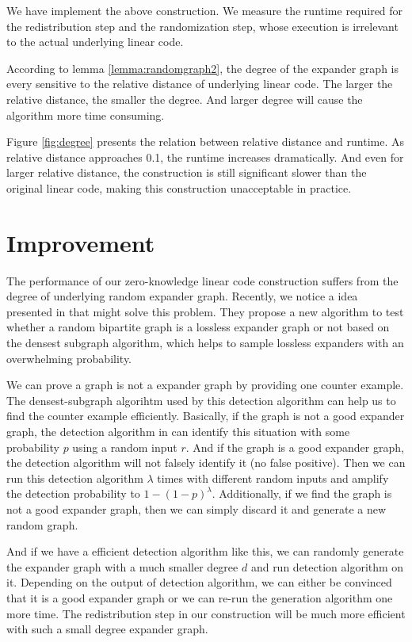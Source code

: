 We have implement the above construction. We measure the runtime required for the redistribution step and the randomization step, whose execution is irrelevant to the actual underlying linear code.


According to lemma \ref{lemma:randomgraph2}, the degree of the expander graph is every sensitive to the relative distance of underlying linear code. The larger the relative distance, the smaller the degree. And larger degree will cause the algorithm more time consuming.

Figure \ref{fig:degree} presents the relation between relative distance and runtime. As relative distance approaches 0.1, the runtime increases dramatically. And even for larger relative distance, the construction is still significant slower than the original linear code, making this construction unacceptable in practice.

\section{Improvement}

The performance of our zero-knowledge linear code construction suffers from the degree of underlying random expander graph. Recently, we notice a idea presented in \cite{orion} that might solve this problem. They propose a new algorithm to test whether a random bipartite graph is a lossless expander graph or not based on the densest subgraph algorithm, which helps to sample lossless expanders with an overwhelming probability.

We can prove a graph is not a expander graph by providing one counter example. The densest-subgraph algorihtm used by this detection algorithm can help us to find the counter example efficiently.
Basically, if the graph is not a good expander graph, the detection algorithm in \cite{orion} can identify this situation with some probability $p$ using a random input $r$. And if the graph is a good expander graph, the detection algorithm will not falsely identify it (no false positive). Then we can run this detection algorithm $\lambda$ times with different random inputs and amplify the detection probability to $1 - (1 - p)^\lambda$. Additionally, if we find the graph is not a good expander graph, then we can simply discard it and generate a new random graph.


And if we have a efficient detection algorithm like this, we can randomly generate the expander graph with a much smaller degree $d$ and run detection algorithm on it. Depending on the output of detection algorithm, we can either be convinced that it is a good expander graph or we can re-run the generation algorithm one more time. The redistribution step in our construction will be much more efficient with such a small degree expander graph.


